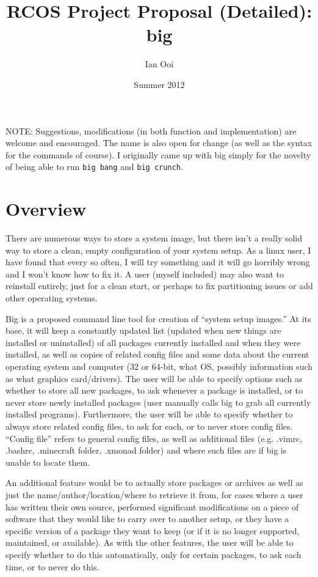 \documentclass[12pt]{article}
\title{RCOS Project Proposal (Detailed): big}
\author{Ian Ooi}
\date{Summer 2012}
\begin{document}
    \maketitle
    NOTE: Suggestions, modifications (in both function and implementation) are welcome and encouraged.  The name is also open for change (as well as the syntax for the commands of course).  I originally came up with big simply for the novelty of being able to run \verb+big bang+ and \verb+big crunch+.
    \section{Overview}
        There are numerous ways to store a system image, but there isn't a really solid way to store a clean, empty configuration of your system setup.  As a linux user, I have found that every so often, I will try something and it will go horribly wrong and I won't know how to fix it.  A user (myself included) may also want to reinstall entirely, just for a clean start, or perhaps to fix partitioning issues or add other operating systems.

        Big is a proposed command line tool for creation of ``system setup images.''  At its base, it will keep a constantly updated list (updated when new things are installed or uninstalled) of all packages currently installed and when they were installed, as well as copies of related config files and some data about the current operating system and computer (32 or 64-bit, what OS, possibly information such as what graphics card/drivers).  The user will be able to specify options such as whether to store all new packages, to ask whenever a package is installed, or to never store newly installed packages (user manually calls big to grab all currently installed programs).  Furthermore, the user will be able to specify whether to always store related config files, to ask for each, or to never store config files.  ``Config file'' refers to general config files, as well as additional files (e.g. .vimrc, .bashrc, .minecraft folder, .xmonad folder) and where such files are if big is unable to locate them.

        An additional feature would be to actually store packages or archives as well as just the name/author/location/where to retrieve it from, for cases where a user has written their own source, performed significant modifications on a piece of software that they would like to carry over to another setup, or they have a specific version of a package they want to keep (or if it is no longer supported, maintained, or available).  As with the other features, the user will be able to specify whether to do this automatically, only for certain packages, to ask each time, or to never do this.
\end{document}
